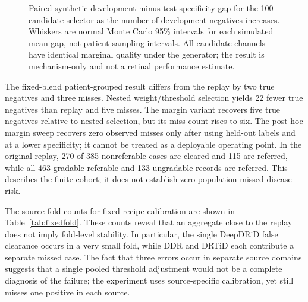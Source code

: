 \documentclass{ieeeaccess}
\begin{document}
\begin{figure}[t]
\centering
{}
\caption{Paired synthetic development-minus-test specificity gap for the 100-candidate selector as the number of development negatives increases. Whiskers are normal Monte Carlo 95\% intervals for each simulated mean gap, not patient-sampling intervals. All candidate channels have identical marginal quality under the generator; the result is mechanism-only and not a retinal performance estimate.}
\label{fig:negative-sample-sensitivity}
\end{figure}

The fixed-blend patient-grouped result differs from the replay by two true negatives and three misses. Nested weight/threshold selection yields 22 fewer true negatives than replay and five misses. The margin variant recovers five true negatives relative to nested selection, but its miss count rises to six. The post-hoc margin sweep recovers zero observed misses only after using held-out labels and at a lower specificity; it cannot be treated as a deployable operating point. In the original replay, 270 of 385 nonreferable cases are cleared and 115 are referred, while all 463 gradable referable and 133 ungradable records are referred. This describes the finite cohort; it does not establish zero population missed-disease risk.

The source-fold counts for fixed-recipe calibration are shown in Table~\ref{tab:fixedfold}. These counts reveal that an aggregate close to the replay does not imply fold-level stability. In particular, the single DeepDRiD false clearance occurs in a very small fold, while DDR and DRTiD each contribute a separate missed case. The fact that three errors occur in separate source domains suggests that a single pooled threshold adjustment would not be a complete diagnosis of the failure; the experiment uses source-specific calibration, yet still misses one positive in each source.
\end{document}
